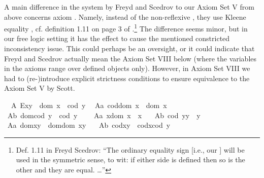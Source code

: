 \begin{isabellebody}
\begin{isamarkuptext}
  A main difference in the system by Freyd and Scedrov to our Axiom Set V from above concerns
  axiom . Namely, instead of the non-reflexive \isa{{\isasymsimeq}}, they use Kleene 
  equality \isa{{\isasymcong}}, cf. definition 1.11 on page 3 of \cite{FreydScedrov90}.\footnote{Def. 1.11 in Freyd 
  Scedrov: ``The ordinary equality sign \isa{{\isacharequal}} [i.e., our \isa{{\isasymcong}}] will be used in the
  symmetric sense, to wit: if either side is defined then so is the other and they are equal. \ldots''} 
  The difference seems minor, but in our free logic setting it has the effect to cause the mentioned
  constricted inconsistency issue. This could perhaps be an oversight, or it could indicate
  that Freyd and Scedrov actually mean the Axiom Set VIII below (where the variables in the axioms range 
  over defined objects only). However, in Axiom Set VIII we had to (re-)introduce explicit 
  strictness conditions to ensure equivalence to the Axiom Set V by Scott.%
\end{isamarkuptext}\isamarkuptrue%
%
\isamarkuptrue%
\ \ A{}{\isacharcolon}\ {\isachardoublequoteopen}E{\isacharparenleft}x{\isasymcdot}y{\isacharparenright}\ \isactrlbold {\isasymleftrightarrow}\ dom\ x\ {\isasymsimeq}\ cod\ y{\isachardoublequoteclose}\ \isanewline
\ A{}a{\isacharcolon}\ {\isachardoublequoteopen}cod{\isacharparenleft}dom\ x{\isacharparenright}\ {\isasymcong}\ dom\ x{\isachardoublequoteclose}\ \ \ \isanewline
\ A{}b{\isacharcolon}\ {\isachardoublequoteopen}dom{\isacharparenleft}cod\ y{\isacharparenright}\ {\isasymcong}\ cod\ y{\isachardoublequoteclose}\ \ \ \isanewline
\ A{}a{\isacharcolon}\ {\isachardoublequoteopen}x{\isasymcdot}{\isacharparenleft}dom\ x{\isacharparenright}\ {\isasymcong}\ x{\isachardoublequoteclose}\ \ \isanewline
\ A{}b{\isacharcolon}\ {\isachardoublequoteopen}{\isacharparenleft}cod\ y{\isacharparenright}{\isasymcdot}y\ {\isasymcong}\ y{\isachardoublequoteclose}\ \ \isanewline
\ A{}a{\isacharcolon}\ {\isachardoublequoteopen}dom{\isacharparenleft}x{\isasymcdot}y{\isacharparenright}\ {\isasymcong}\ dom{\isacharparenleft}{\isacharparenleft}dom\ x{\isacharparenright}{\isasymcdot}y{\isacharparenright}{\isachardoublequoteclose}\ \ \isanewline
\ A{}b{\isacharcolon}\ {\isachardoublequoteopen}cod{\isacharparenleft}x{\isasymcdot}y{\isacharparenright}\ {\isasymcong}\ cod{\isacharparenleft}x{\isasymcdot}{\isacharparenleft}cod\ y{\isacharparenright}{\isacharparenright}{\isachardoublequoteclose}\ \ \isanewline

\end{isabellebody}

